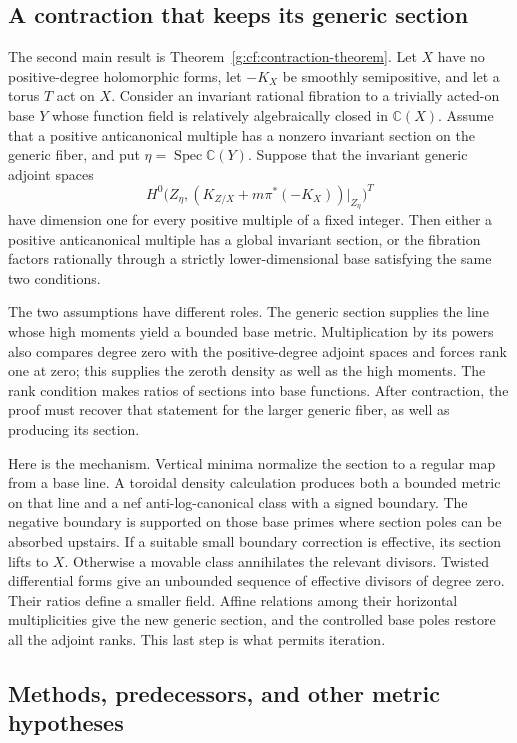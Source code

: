 \subsection{A contraction that keeps its generic section}

The second main result is Theorem~\ref{g:cf:contraction-theorem}.
Let $X$ have no positive-degree holomorphic forms, let $-K_X$ be smoothly
semipositive, and let a torus $T$ act on $X$. Consider an invariant
rational fibration to a trivially acted-on base $Y$ whose function field is relatively
algebraically closed in $\mathbb C(X)$. Assume that a positive
anticanonical multiple has a nonzero invariant section on the generic
fiber, and put $\eta=\operatorname{Spec}\mathbb C(Y)$. Suppose that the invariant generic adjoint spaces
\[
 H^0\bigl(Z_\eta,(K_{Z/X}+m\pi^*(-K_X))|_{Z_\eta}\bigr)^T
\]
have dimension one for every positive multiple of a fixed integer.
Then either a positive anticanonical multiple has a global invariant
section, or the fibration factors rationally through a strictly
lower-dimensional base satisfying the same two conditions.

The two assumptions have different roles. The generic section supplies
the line whose high moments yield a bounded base metric. Multiplication
by its powers also compares degree zero with the positive-degree
adjoint spaces and forces rank one at zero; this supplies the zeroth
density as well as the high moments. The rank condition makes ratios of sections into base
functions. After contraction, the proof must recover that statement
for the larger generic fiber, as well as producing its section.

Here is the mechanism. Vertical minima normalize the section to a
regular map from a base line. A toroidal density calculation produces
both a bounded metric on that line and a nef anti-log-canonical class
with a signed boundary. The negative boundary is supported on
those base primes where section poles can be absorbed upstairs.
If a suitable small boundary correction is effective, its section
lifts to $X$. Otherwise a movable class annihilates the relevant
divisors. Twisted differential forms give an unbounded sequence of
effective divisors of degree zero. Their ratios define a smaller
field. Affine relations among their horizontal multiplicities give the
new generic section, and the controlled base poles restore all the
adjoint ranks. This last step is what permits iteration.

\subsection{Methods, predecessors, and other metric hypotheses}

